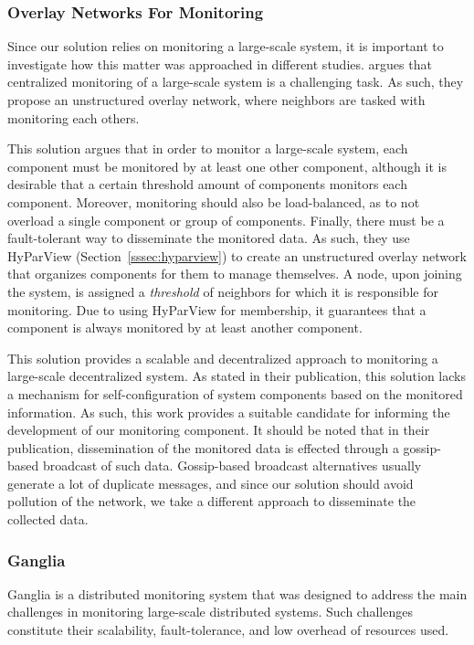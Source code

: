 \subsubsection{Overlay Networks For Monitoring}
\label{sssec:verlay_networks_for_monitoring}

Since our solution relies on monitoring a large-scale system, it is important to investigate how this matter was approached in different studies. \cite{Leitao2008} argues that centralized monitoring of a large-scale system is a challenging task. As such, they propose an unstructured overlay network, where neighbors are tasked with monitoring each others.

This solution argues that in order to monitor a large-scale system, each component must be monitored by at least one other component, although it is desirable that a certain threshold amount of components monitors each component. Moreover, monitoring should also be load-balanced, as to not overload a single component or group of components. Finally, there must be a fault-tolerant way to disseminate the monitored data. As such, they use HyParView (Section~\ref{sssec:hyparview}) to create an unstructured overlay network that organizes components for them to manage themselves. A node, upon joining the system, is assigned a \textit{threshold} of neighbors for which it is responsible for monitoring. Due to using HyParView for membership, it guarantees that a component is always monitored by at least another component.

This solution provides a scalable and decentralized approach to monitoring a large-scale decentralized system. As stated in their publication, this solution lacks a mechanism for self-configuration of system components based on the monitored information. As such, this work provides a suitable candidate for informing the development of our monitoring component. It should be noted that in their publication, dissemination of the monitored data is effected through a gossip-based broadcast of such data. Gossip-based broadcast alternatives usually generate a lot of duplicate messages, and since our solution should avoid pollution of the network, we take a different approach to disseminate the collected data.

\subsubsection{Ganglia}
\label{sssec:ganglia}

Ganglia\cite{Massie2004} is a distributed monitoring system that was designed to address the main challenges in monitoring large-scale distributed systems. Such challenges constitute their scalability, fault-tolerance, and low overhead of resources used.

